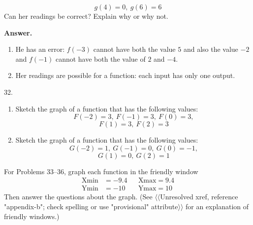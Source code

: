 \documentclass[10pt,]{book}
\theoremstyle{plain}
\theoremstyle{definition}
\theoremstyle{definition}
\theoremstyle{definition}
\theoremstyle{definition}
\numberwithin{equation}{part}
\newcommand{\amp}{&}
\begin{document}
\begin{exerciselist}
\begin{enumerate}[label=*\alph**]
\begin{equation*}
\end{equation*}
%
\begin{equation*}
g(4) = 0, ~g(6) = 6
\end{equation*}
Can her readings be correct? Explain why or why not.%
\end{enumerate}
%
\par\smallskip
\par\smallskip
\noindent\textbf{Answer.}\hypertarget{answer-108}{}\quad
\leavevmode%
\begin{enumerate}[label=*\alph**]
\item\hypertarget{li-817}{}He has an error: \(f (-3)\) cannot have both the value \(5\) and also the value \(-2\) and \(f (-1)\) cannot have both the value of \(2\) and \(-4\).%
\item\hypertarget{li-818}{}Her readings are possible for a function: each input has only one output.%
\end{enumerate}
%
\item[32.]\hypertarget{exercise-189}{}\leavevmode%
\begin{enumerate}[label=*\alph**]
\item\hypertarget{li-819}{}Sketch the graph of a function that has the following values:%
\begin{equation*}
F(-2) = 3, ~F(-1) = 3, ~F(0) = 3,
\end{equation*}
%
\begin{equation*}
F(1) = 3, ~F(2) = 3
\end{equation*}
%
\item\hypertarget{li-820}{}Sketch the graph of a function that has the following values:%
\begin{equation*}
G(-2) = 1, ~G(-1) = 0, ~G(0) = -1,
\end{equation*}
%
\begin{equation*}
G(1) = 0, ~G(2) = 1
\end{equation*}
%
\end{enumerate}
%
\par\smallskip
\hypertarget{exercisegroup-21}{}\par\noindent For Problems 33–36, graph each function in the friendly window%
\begin{align*}
\text{Xmin} \amp = -9.4 \amp\amp \text{Xmax} = 9.4
\\
\text{Ymin} \amp = -10 \amp\amp \text{Ymax} = 10
\end{align*}
Then answer the questions about the graph. (See {$\langle\langle$Unresolved xref, reference "appendix-b"; check spelling or use "provisional" attribute$\rangle\rangle$}  for an explanation of friendly windows.)%

\end{exerciselist}
\end{document}
